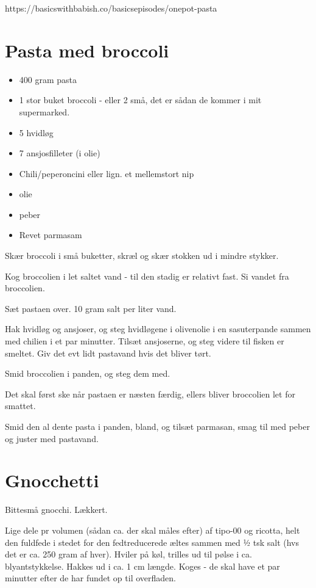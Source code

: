 \documentclass[
  letterpaper,
  DIV=11,
  numbers=noendperiod]{scrreprt}
\providecommand{\tightlist}{%
  \setlength{\itemsep}{0pt}\setlength{\parskip}{0pt}}\usepackage{longtable,booktabs,array}
\begin{document}
https://basicswithbabish.co/basicsepisodes/onepot-pasta

\hypertarget{pasta-med-broccoli}{%
\section{Pasta med broccoli}\label{pasta-med-broccoli}}

\begin{itemize}
\tightlist
\item
  400 gram pasta
\item
  1 stor buket broccoli - eller 2 små, det er sådan de kommer i mit
  supermarked.
\item
  5 hvidløg
\item
  7 ansjosfilleter (i olie)
\item
  Chili/peperoncini eller lign. et mellemstort nip
\item
  olie
\item
  peber
\item
  Revet parmasam
\end{itemize}

Skær broccoli i små buketter, skræl og skær stokken ud i mindre stykker.

Kog broccolien i let saltet vand - til den stadig er relativt fast. Si
vandet fra broccolien.

Sæt pastaen over. 10 gram salt per liter vand.

Hak hvidløg og ansjoser, og steg hvidløgene i olivenolie i en
sasuterpande sammen med chilien i et par minutter. Tilsæt ansjoserne, og
steg videre til fisken er smeltet. Giv det evt lidt pastavand hvis det
bliver tørt.

Smid broccolien i panden, og steg dem med.

Det skal først ske når pastaen er næsten færdig, ellers bliver
broccolien let for smattet.

Smid den al dente pasta i panden, bland, og tilsæt parmasan, smag til
med peber og juster med pastavand.

\hypertarget{gnocchetti}{%
\section{Gnocchetti}\label{gnocchetti}}

Bittesmå gnocchi. Lækkert.

Lige dele pr volumen (sådan ca. der skal måles efter) af tipo-00 og
ricotta, helt den fuldfede i stedet for den fedtreducerede æltes sammen
med ½ tsk salt (hvs det er ca. 250 gram af hver). Hviler på køl, trilles
ud til pølse i ca. blyantstykkelse. Hakkes ud i ca. 1 cm længde. Koges -
de skal have et par minutter efter de har fundet op til overfladen.
\end{document}
